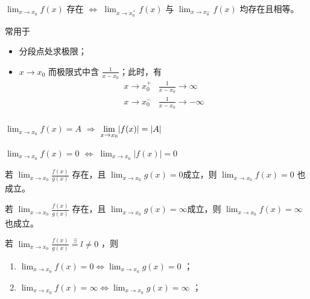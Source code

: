 \begin{Field}[极限命题1]

    $ {\displaystyle\lim_{x\rightarrow x_0}}f(x) $ 存在 $ \Leftrightarrow $ $ {\displaystyle\lim_{x\rightarrow x_0^+}}f(x) $ 
    与 $ {\displaystyle\lim_{x\rightarrow x_0^-}}f(x) $ 均存在且相等。
\end{Field}

常用于

\begin{itemize}
    \item 分段点处求极限；
    \item $ x\rightarrow x_0 $ 而极限式中含 $ \frac{1}{x-x_0} $；此时，有
    \begin{eqnarray*}
        x\rightarrow x_0^+&\frac{1}{x-x_0}\rightarrow\infty\\
        x\rightarrow x_0^-&\frac{1}{x-x_0}\rightarrow-\infty\\
    \end{eqnarray*}
\end{itemize}

\begin{Field}[极限命题2]

    $ {\displaystyle\lim_{x\rightarrow x_0}}f(x)=A $ $ \Rightarrow $ 
    $ {\displaystyle\displaystyle\lim_{x\rightarrow x_0}}|f(x)| = |A| $ 
\end{Field}

\begin{Field}[极限命题3]

    $ {\displaystyle\lim_{x\rightarrow x_0}}f(x)=0 $ $ \Leftrightarrow $ 
    $ {\displaystyle\lim_{x\rightarrow x_0}}|f(x)| = 0 $ 
\end{Field}

\begin{Field}[极限命题4]

    若 $ {\displaystyle\lim_{x\rightarrow x_0}}\frac{f(x)}{g(x)} $ 存在，且
    $ {\displaystyle\lim_{x\rightarrow x_0}}g(x)=0 $成立，则
    $ {\displaystyle\lim_{x\rightarrow x_0}}f(x)=0 $ 也成立。
\end{Field}


\begin{Field}[极限命题4推论]

    若 $ {\displaystyle\lim_{x\rightarrow x_0}}\frac{f(x)}{g(x)} $ 存在，且
    $ {\displaystyle\lim_{x\rightarrow x_0}}g(x)=\infty $成立，则
    $ {\displaystyle\lim_{x\rightarrow x_0}}f(x)=\infty $ 也成立。
\end{Field}

\begin{Field}[极限命题5]

    若 $ {\displaystyle\lim_{x\rightarrow x_0}}\frac{f(x)}{g(x)}\mathop{=}\limits^\exists l \neq 0 $ ，则
    \begin{enumerate}
        \item $ {\displaystyle\lim_{x\rightarrow x_0}}f(x)=0\Leftrightarrow {\displaystyle\lim_{x\rightarrow x_0}} g(x)=0 $ ；
        \item $ {\displaystyle\lim_{x\rightarrow x_0}}f(x)=\infty\Leftrightarrow {\displaystyle\lim_{x\rightarrow x_0}} g(x)=\infty $ ；
    \end{enumerate}
\end{Field}

